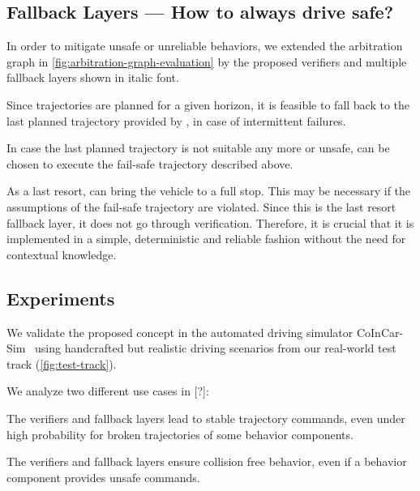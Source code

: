 


\subsection{Fallback Layers --- How to always \textbf{drive safe}?}

In order to mitigate unsafe or unreliable behaviors,
we extended the arbitration graph in \cref{fig:arbitration-graph-evaluation}
by the proposed verifiers and multiple fallback layers
shown in italic font.

Since trajectories are planned for a given horizon,
it is feasible to fall back to the last planned trajectory
provided by ,
in case of intermittent failures.

In case the last planned trajectory is not suitable any more or unsafe,
 can be chosen to execute the fail-safe trajectory described above.

As a last resort,  can bring the vehicle to a full stop.
This may be necessary if the assumptions of the fail-safe trajectory are violated.
%
Since this is the last resort fallback layer,
it does not go through verification.
Therefore, it is crucial that it is implemented in a simple, deterministic and reliable fashion
without the need for contextual knowledge.




\subsection{Experiments}

We validate the proposed concept in the automated driving simulator CoInCar-Sim~\cite{naumann_coincar-sim_2018}
using handcrafted but realistic driving scenarios
from our real-world test track%
(\cref{fig:test-track}).

We analyze two different use cases
in [?]:
%
\begin{description}[align=left]
    \item[Ensuring driveability]
        The verifiers and fallback layers lead to stable trajectory commands,
        even under high probability for broken trajectories of some behavior components.
    \item[Guaranteeing vehicle safety]
        The verifiers and fallback layers ensure collision free behavior,
        even if a behavior component provides unsafe commands.
\end{description}

